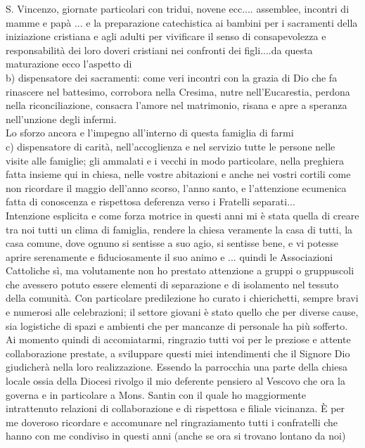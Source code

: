 S. Vincenzo, giornate particolari con tridui, novene ecc.... assemblee, incontri di mamme e papà ... e la preparazione catechistica ai bambini per i sacramenti della iniziazione cristiana e 
agli adulti per vivificare il senso di consapevolezza e responsabilità dei loro doveri cristiani nei confronti dei figli....da questa maturazione ecco l'aspetto di\\
b) dispensatore dei sacramenti: come veri incontri con la grazia di Dio che fa rinascere nel battesimo, corrobora nella Cresima, nutre nell'Eucarestia, perdona nella riconciliazione, 
consacra l'amore nel matrimonio, risana e apre a speranza nell'unzione degli infermi.\\Lo sforzo ancora e l'impegno all'interno di questa famiglia di farmi\\
c) dispensatore di carità, nell'accoglienza e nel servizio tutte le persone nelle visite alle famiglie; gli ammalati e i vecchi in modo particolare, nella preghiera fatta insieme qui in chiesa,
nelle vostre abitazioni e anche nei vostri cortili come non ricordare il maggio dell'anno scorso, l'anno santo, e l'attenzione ecumenica fatta di conoscenza 
e rispettosa deferenza verso i Fratelli separati...\\
Intenzione esplicita e come forza motrice in questi anni mi è stata quella di creare tra noi tutti un clima di famiglia, rendere la chiesa veramente la casa di tutti, la casa comune, dove ognuno si
sentisse a suo agio, si sentisse bene, e vi potesse aprire serenamente e fiduciosamente il suo animo e ...
quindi le Associazioni Cattoliche sì, ma volutamente non ho prestato attenzione a gruppi o gruppuscoli che avessero potuto essere elementi di separazione e di isolamento nel tessuto della
comunità. Con particolare predilezione ho curato i chierichetti, sempre bravi e numerosi alle celebrazioni; il settore giovani è stato quello che per diverse cause, 
sia logistiche di spazi e ambienti che per mancanze di personale ha più sofferto.
Ai momento quindi di accomiatarmi, ringrazio tutti voi per le preziose e attente collaborazione prestate, a sviluppare questi miei intendimenti che il Signore Dio giudicherà nella 
loro realizzazione.
Essendo la parrocchia una parte della chiesa locale ossia della Diocesi rivolgo il mio deferente pensiero al Vescovo che ora la governa e in particolare a Mons. Santin con il quale
ho maggiormente intrattenuto relazioni di collaborazione e di rispettosa e filiale vicinanza.
È per me doveroso ricordare e accomunare nel ringraziamento tutti i confratelli che hanno con me condiviso in questi anni (anche se ora si trovano lontano da noi) 
